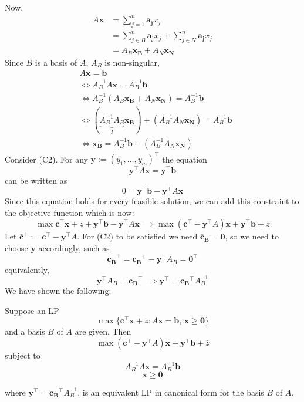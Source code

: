 Now,
\begin{align*}
    A\bm{x}
     & =\sum_{j = 1}^{n}\bm{a_j}x_j                               \\
     & =\sum_{j\in B}^{n}\bm{a_j}x_j+\sum_{j\in N}^{n}\bm{a_j}x_j \\
     & =A_B \bm{x_B}+A_N \bm{x_N}
\end{align*}
Since $B$ is a basis of $A$, $A_B$ is non-singular,
\begin{align*}
     & A\bm{x}=\bm{b}                                \\
     & \iff
    A_B^{-1}A\bm{x}=A_B^{-1}\bm{b}                   \\
     & \iff
    A_B^{-1}(A_B\bm{x_B}+A_N\bm{x_N})=A_B^{-1}\bm{b} \\
     & \iff
    (\underbrace{A_B^{-1} A_B}_{I}\bm{x_B})+
    (A_B^{-1} A_N\bm{x_N})=A_B^{-1}\bm{b}            \\
     & \iff
    \bm{x_B}=A_B^{-1}\bm{b}-(A_B^{-1} A_N\bm{x_N})
\end{align*}
Consider (C2). For any $\bm{y}:=(y_1,\dots, y_m)^\top$
the equation
\[\bm{y}^\top A\bm{x}=\bm{y}^\top \bm{b}\]
can be written as
\[0=\bm{y}^\top \bm{b}-\bm{y}^\top A\bm{x}\]
Since  this  equation  holds  for  every  feasible  solution,  we  can  add  this
constraint to the objective function which is now:
\[\max \bm{c}^\top  \bm{x}+\bar{z}+\bm{y}^\top \bm{b}-\bm{y}^\top A\bm{x}
    \implies
    \max (\bm{c}^\top -\bm{y}^\top A)\bm{x}+\bm{y}^\top \bm{b}+\bar{z}\]
Let $\bm{\bar{c}}^\top :=\bm{c}^\top -\bm{y}^\top A$. For (C2) to be satisfied we need
$\bm{\bar{c}_B}=\bm{0}$, so we need to choose $\bm{y}$ accordingly, such as
\[\bm{\bar{c}_B}^\top =\bm{c_B}^\top -\bm{y}^\top A_B=\bm{0}^\top \]
equivalently,
\[\bm{y}^\top A_B=\bm{c_B}^\top
    \implies
    \bm{y}^\top =\bm{c_B}^\top A_B^{-1}\]
We have shown the following:

\begin{thmbox}
    \begin{theorem}
        Suppose an LP
        \[ \max \{\bm{c}^\top \bm{x}+\bar{z}:A \bm{x}=\bm{b},\, \bm{x}\geqslant  \bm{0}\} \]
        and a basis $ B $ of $ A $ are given. Then
        \[\max (\bm{c}^\top -\bm{y}^\top A)\bm{x}+\bm{y}^\top \bm{b}+\bar{z}\]
        subject to
        \[ A_B^{-1}A\bm{x}=A_B^{-1}\bm{b} \]
        \[ \bm{x}\geqslant  \bm{0} \]

        where $\bm{y}^\top =\bm{c_B}^\top A_B^{-1}$, is an equivalent LP in canonical form for the
        basis $B$ of $A$.
    \end{theorem}
\end{thmbox}

